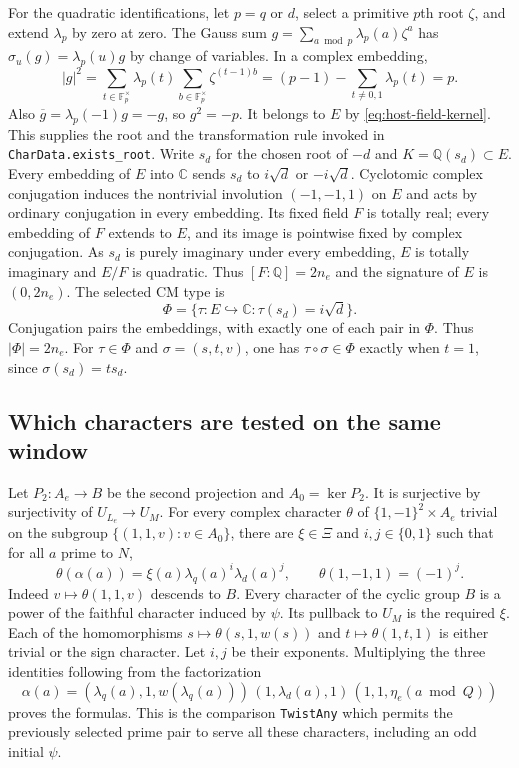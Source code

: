 For the quadratic identifications, let $p=q$ or $d$, select a
primitive $p$th root $\zeta$, and extend $\lambda_p$ by zero at zero.
The Gauss sum $g=\sum_{a\bmod p}\lambda_p(a)\zeta^a$ has
$\sigma_u(g)=\lambda_p(u)g$ by change of variables. In a complex
embedding,
\[
 |g|^2=\sum_{t\in\mathbb F_p^\times}\lambda_p(t)
               \sum_{b\in\mathbb F_p^\times}\zeta^{(t-1)b}
       =(p-1)-\sum_{t\ne0,1}\lambda_p(t)=p .
\]
Also $\overline g=\lambda_p(-1)g=-g$, so $g^2=-p$.
It belongs to $E$ by \eqref{eq:host-field-kernel}. This supplies
the root and the transformation rule invoked in
\texttt{CharData.exists\_root}. Write $s_d$ for the chosen root of
$-d$ and $K=\mathbb Q(s_d)\subset E$. Every embedding of $E$ into
$\mathbb C$ sends $s_d$ to $i\sqrt d$ or $-i\sqrt d$.
Cyclotomic complex conjugation induces the nontrivial involution
$(-1,-1,1)$ on $E$ and acts by ordinary conjugation in every embedding.
Its fixed field $F$ is totally real; every embedding of $F$ extends
to $E$, and its image is pointwise fixed by complex conjugation.
As $s_d$ is purely imaginary under every embedding, $E$ is totally
imaginary and $E/F$ is quadratic. Thus $[F:\mathbb Q]=2n_e$ and the
signature of $E$ is $(0,2n_e)$. The selected CM type is
\[
   \Phi=\{\tau:E\hookrightarrow\mathbb C:\tau(s_d)=i\sqrt d\}.
\]
Conjugation pairs the embeddings, with exactly one of each pair in
$\Phi$. Thus $|\Phi|=2n_e$. For $\tau\in\Phi$ and
$\sigma=(s,t,v)$, one has $\tau\circ\sigma\in\Phi$ exactly when
$t=1$, since $\sigma(s_d)=t s_d$.

\subsection{Which characters are tested on the same window}

Let $P_2:A_e\to B$ be the second projection and $A_0=\ker P_2$.
It is surjective by surjectivity of $U_{L_e}\to U_M$.
For every complex character $\theta$ of $\{1,-1\}^2\times A_e$
trivial on the subgroup $\{(1,1,v):v\in A_0\}$, there are
$\xi\in\Xi$ and $i,j\in\{0,1\}$ such that for all $a$ prime to $N$,
\[
   \theta(\alpha(a))=\xi(a)\lambda_q(a)^i\lambda_d(a)^j,
       \qquad \theta(1,-1,1)=(-1)^j.
\]
Indeed $v\mapsto\theta(1,1,v)$ descends to $B$. Every character
of the cyclic group $B$ is a power of the faithful character induced
by $\psi$. Its pullback to $U_M$ is the required $\xi$.
Each of the homomorphisms
$s\mapsto\theta(s,1,w(s))$ and $t\mapsto\theta(1,t,1)$ is either
trivial or the sign character. Let $i,j$ be their exponents. Multiplying
the three identities following from the factorization
\[
  \alpha(a)=(\lambda_q(a),1,w(\lambda_q(a)))\,
             (1,\lambda_d(a),1)\,(1,1,\eta_e(a\bmod Q))
\]
proves the formulas. This is the comparison \texttt{TwistAny}
which permits the previously selected prime pair to serve all these
characters, including an odd initial $\psi$.

